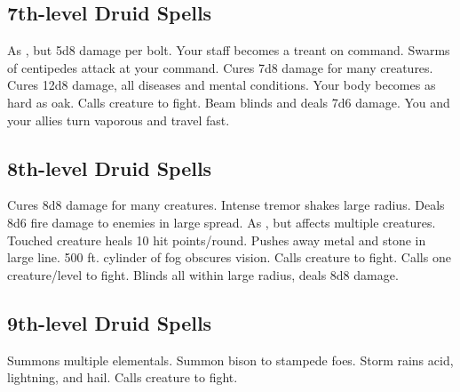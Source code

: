 \subsection{7th-level Druid Spells}
\begin{spelllist}
   As , but 5d8 damage per bolt.
   Your staff becomes a treant on command.
   Swarms of centipedes attack at your command.
   Cures 7d8 damage for many creatures.
   Cures 12d8 damage, all diseases and mental conditions.
   Your body becomes as hard as oak. 
   Calls creature to fight.
   Beam blinds and deals 7d6 damage.
   You and your allies turn vaporous and travel fast.
\end{spelllist}

\subsection{8th-level Druid Spells}
\begin{spelllist}
   Cures 8d8 damage for many creatures.
   Intense tremor shakes large radius.
   Deals 8d6 fire damage to enemies in large spread.
   As , but affects multiple creatures.
   Touched creature heals 10 hit points/round.
   Pushes away metal and stone in large line.
   500 ft. cylinder of fog obscures vision.
   Calls creature to fight.
   Calls one creature/level to fight.
   Blinds all within large radius, deals 8d8 damage.
\end{spelllist}

\subsection{9th-level Druid Spells}
\begin{spelllist}
   Summons multiple elementals.
   Summon bison to stampede foes.
   Storm rains acid, lightning, and hail.
   Calls creature to fight.
\end{spelllist}

